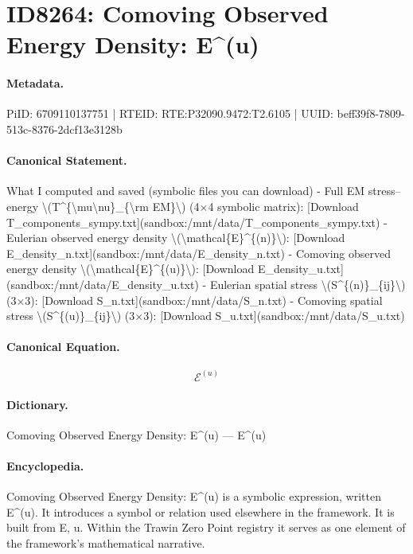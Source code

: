 \section*{ID8264: Comoving Observed Energy Density: E\textasciicircum{}(u)}
\paragraph{Metadata.}
PiID: 6709110137751 | RTEID: RTE:P32090.9472:T2.6105 | UUID: beff39f8-7809-513c-8376-2dcf13e3128b

\paragraph{Canonical Statement.}
What I computed and saved (symbolic files you can download) - Full EM stress–energy \textbackslash{}(T\textasciicircum{}\{\textbackslash{}mu\textbackslash{}nu\}\_\{\textbackslash{}rm EM\}\textbackslash{}) (4×4 symbolic matrix): [Download T\_components\_sympy.txt](sandbox:/mnt/data/T\_components\_sympy.txt) - Eulerian observed energy density \textbackslash{}(\textbackslash{}mathcal\{E\}\textasciicircum{}\{(n)\}\textbackslash{}): [Download E\_density\_n.txt](sandbox:/mnt/data/E\_density\_n.txt) - Comoving observed energy density \textbackslash{}(\textbackslash{}mathcal\{E\}\textasciicircum{}\{(u)\}\textbackslash{}): [Download E\_density\_u.txt](sandbox:/mnt/data/E\_density\_u.txt) - Eulerian spatial stress \textbackslash{}(S\textasciicircum{}\{(n)\}\_\{ij\}\textbackslash{}) (3×3): [Download S\_n.txt](sandbox:/mnt/data/S\_n.txt) - Comoving spatial stress \textbackslash{}(S\textasciicircum{}\{(u)\}\_\{ij\}\textbackslash{}) (3×3): [Download S\_u.txt](sandbox:/mnt/data/S\_u.txt)

\paragraph{Canonical Equation.}
\[
\mathcal{E}^{(u)}
\]

\paragraph{Dictionary.}
Comoving Observed Energy Density: E\textasciicircum{}(u) — E\textasciicircum{}(u)

\paragraph{Encyclopedia.}
Comoving Observed Energy Density: E\textasciicircum{}(u) is a symbolic expression, written E\textasciicircum{}(u). It introduces a symbol or relation used elsewhere in the framework. It is built from E, u. Within the Trawin Zero Point registry it serves as one element of the framework's mathematical narrative.
